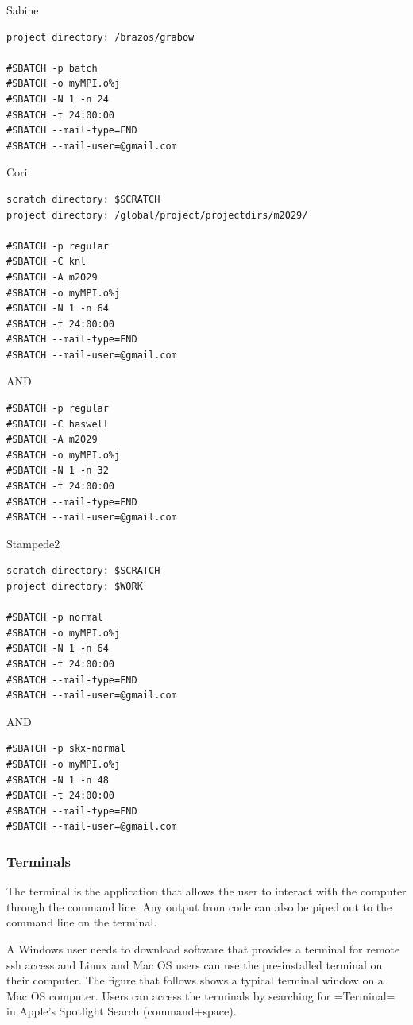 \documentclass[11pt]{article}
\begin{document}
Sabine

\begin{verbatim}
project directory: /brazos/grabow

#SBATCH -p batch
#SBATCH -o myMPI.o%j   
#SBATCH -N 1 -n 24
#SBATCH -t 24:00:00
#SBATCH --mail-type=END
#SBATCH --mail-user=@gmail.com  
\end{verbatim}

Cori

\begin{verbatim}
scratch directory: $SCRATCH
project directory: /global/project/projectdirs/m2029/

#SBATCH -p regular
#SBATCH -C knl
#SBATCH -A m2029
#SBATCH -o myMPI.o%j   
#SBATCH -N 1 -n 64
#SBATCH -t 24:00:00
#SBATCH --mail-type=END
#SBATCH --mail-user=@gmail.com  
\end{verbatim}

AND

\begin{verbatim}
#SBATCH -p regular
#SBATCH -C haswell
#SBATCH -A m2029
#SBATCH -o myMPI.o%j   
#SBATCH -N 1 -n 32
#SBATCH -t 24:00:00
#SBATCH --mail-type=END
#SBATCH --mail-user=@gmail.com  
\end{verbatim}

Stampede2

\begin{verbatim}
scratch directory: $SCRATCH
project directory: $WORK

#SBATCH -p normal
#SBATCH -o myMPI.o%j   
#SBATCH -N 1 -n 64
#SBATCH -t 24:00:00
#SBATCH --mail-type=END
#SBATCH --mail-user=@gmail.com  
\end{verbatim}

AND

\begin{verbatim}
#SBATCH -p skx-normal
#SBATCH -o myMPI.o%j   
#SBATCH -N 1 -n 48
#SBATCH -t 24:00:00
#SBATCH --mail-type=END
#SBATCH --mail-user=@gmail.com  
\end{verbatim}

    \subsubsection{Terminals}\label{terminals}

The terminal is the application that allows the user to interact with
the computer through the command line. Any output from code can also be
piped out to the command line on the terminal.

A Windows user needs to download software that provides a terminal for
remote ssh access and Linux and Mac OS users can use the pre-installed
terminal on their computer. The figure that follows shows a typical
terminal window on a Mac OS computer. Users can access the terminals by
searching for =Terminal= in Apple's Spotlight Search (command+space).
\end{document}
